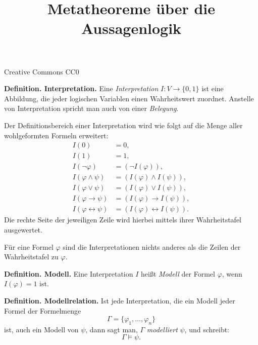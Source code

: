\documentclass{beamer}
\title{Metatheoreme über die Aussagenlogik}
\date{}
\newcommand{\modest}[1]{{\small\color{gray}#1}}
\newcommand{\strong}[1]{\textsf{\textbf{#1}}}
\begin{document}
\begin{frame}
\maketitle
\vfill\hfill
\modest{Creative Commons CC0}
\end{frame}

\begin{frame}
\strong{Definition. Interpretation.}
Eine \emph{Interpretation} $I\colon V\to\{0,1\}$ ist eine Abbildung,
die jeder logischen Variablen einen Wahrheitswert zuordnet.
Anstelle von Interpretation spricht man auch von einer \emph{Belegung}.
\end{frame}

\begin{frame}
Der Definitionsbereich einer Interpretation wird wie folgt
auf die Menge aller wohlgeformten Formeln erweitert:
\begin{align*}
I(0) &= 0,\\
I(1) &= 1,\\
I(\neg\varphi) &= (\neg I(\varphi)),\\
I(\varphi\land\psi) &= (I(\varphi)\land I(\psi)),\\
I(\varphi\lor\psi) &= (I(\varphi)\lor I(\psi)),\\
I(\varphi\rightarrow\psi) &= (I(\varphi)\rightarrow I(\psi)),\\
I(\varphi\leftrightarrow\psi) &= (I(\varphi)\leftrightarrow I(\psi)).
\end{align*}
Die rechte Seite der jeweiligen Zeile wird hierbei mittels ihrer
Wahrheitstafel ausgewertet.
\end{frame}

\begin{frame}
Für eine Formel $\varphi$ sind die Interpretationen
nichts anderes als die Zeilen der Wahrheitstafel zu $\varphi$.
\end{frame}

\begin{frame}
\strong{Definition. Modell.} Eine Interpretation $I$
heißt \emph{Modell} der Formel $\varphi$, wenn
$I(\varphi)=1$ ist.
\end{frame}

\begin{frame}
\strong{Definition. Modellrelation.}
Ist jede Interpretation, die ein Modell jeder Formel der Formelmenge
\[\Gamma=\{\varphi_1,\ldots,\varphi_n\}\]
ist, auch ein Modell von $\psi$, dann sagt man,
$\Gamma$ \emph{modelliert} $\psi$, und schreibt:
\[\Gamma\models\psi.\]
\end{frame}
\end{document}
